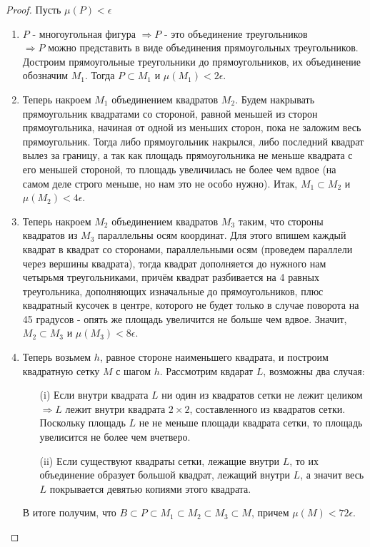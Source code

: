 \begin{proof} Пусть $\mu(P)<\epsilon$
    \begin{enumerate}
        \item $P$ - многоугольная фигура $\Rightarrow P$ - это объединение треугольников\\
        $\Rightarrow P$ можно представить в виде объединения прямоугольных треугольников. Достроим прямоугольные треугольники до прямоугольников, их объединение обозначим $M_1$. Тогда $P\subset M_1$ и $\mu(M_1)<2\epsilon.$
        \item Теперь накроем $M_1$ объединением квадратов $M_2$. Будем накрывать прямоугольник квадратами со стороной, равной меньшей из сторон прямоугольника, начиная от одной из меньших сторон, пока не заложим весь прямоугольник. Тогда либо прямоугольник накрылся, либо последний квадрат вылез за границу, а так как площадь прямоугольника не меньше квадрата с его меньшей стороной, то площадь увеличилась не более чем вдвое (на самом деле строго меньше, но нам это не особо нужно). Итак, $M_1\subset M_2$ и $\mu(M_2)< 4\epsilon$.
        \item Теперь накроем $M_2$ объединением квадратов $M_3$ таким, что стороны квадратов из $M_3$ параллельны осям координат. Для этого впишем каждый квадрат в квадрат со сторонами, параллельными осям (проведем параллели через вершины квадрата), тогда квадрат дополняется до нужного нам четырьмя треугольниками, причём квадрат разбивается на 4 равных треугольника, дополняющих изначальные до прямоугольников, плюс квадратный кусочек в центре, которого не будет только в случае поворота на 45 градусов - опять же площадь увеличится не больше чем вдвое. Значит, $M_2 \subset M_3$ и $\mu(M_3)< 8\epsilon$.
        \item Теперь возьмем $h$, равное стороне наименьшего квадрата, и построим квадратную сетку $M$ с шагом $h$. Рассмотрим квдарат $L$, возможны два случая:
        \begin{itemize}
            \item[(i)] Если внутри квадрата $L$ ни один из квадратов сетки не лежит целиком $\Rightarrow L$ лежит внутри квадрата $2\times 2$, составленного из квадратов сетки. Поскольку площадь $L$ не не меньше площади квадрата сетки, то площадь увелисится не более чем вчетверо.
            \item[(ii)] Если существуют квадраты сетки, лежащие внутри $L$, то их объединение образует большой квадрат, лежащий внутри $L$, а значит весь $L$ покрывается девятью копиями этого квадрата.
        \end{itemize}
        В итоге получим, что $B\subset P\subset M_1\subset M_2\subset M_3\subset M$, причем $\mu(M)<72\epsilon$.
    \end{enumerate}
\end{proof} 
